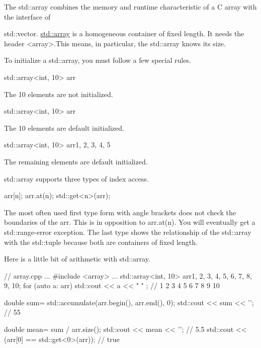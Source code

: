 


The std::array combines the memory and runtime characteristic of a C array with the interface of

std::vector. \href{http://en.cppreference.com/w/cpp/container/array}{std::array} is a homogeneous container of fixed length. It needs the header <array>.This means, in particular, the std::array knows its size.

To initialize a std::array, you must follow a few special rules.

\noindent
std::array<int, 10> arr

The 10 elements are not initialized.

\noindent
std::array<int, 10> arr{}

The 10 elements are default initialized.

\noindent
std::array<int, 10> arr{1, 2, 3, 4, 5}

The remaining elements are default initialized.

std::array supports three types of index access.

\begin{cpp}
arr[n];
arr.at(n);
std::get<n>(arr);
\end{cpp}

The most often used first type form with angle brackets does not check the boundaries of the arr. This is in opposition to arr.at(n). You will eventually get a std::range-error exception. The last type shows the relationship of the std::array with the std::tuple because both are containers of fixed length.

Here is a little bit of arithmetic with std::array.


\begin{cpp}
// array.cpp
...
#include <array>
...
std::array<int, 10> arr{1, 2, 3, 4, 5, 6, 7, 8, 9, 10};
for (auto a: arr) std::cout << a << " " ; // 1 2 3 4 5 6 7 8 9 10

double sum= std::accumulate(arr.begin(), arr.end(), 0);
std::cout << sum << '\n'; // 55

double mean= sum / arr.size();
std::cout << mean << '\n'; // 5.5
std::cout << (arr[0] == std::get<0>(arr)); // true
\end{cpp}




















